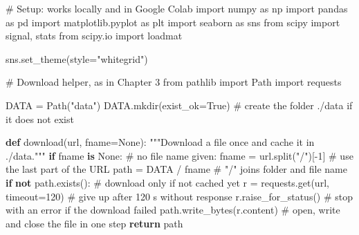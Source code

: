 \documentclass[
  letterpaper,
  DIV=11,
  numbers=noendperiod]{scrreprt}
\newenvironment{Shaded}{\begin{snugshade}}{\end{snugshade}}
\newcommand{\CommentTok}[1]{\textcolor[rgb]{0.37,0.37,0.37}{#1}}
\newcommand{\ControlFlowTok}[1]{\textcolor[rgb]{0.00,0.23,0.31}{\textbf{#1}}}
\newcommand{\DecValTok}[1]{\textcolor[rgb]{0.68,0.00,0.00}{#1}}
\newcommand{\ImportTok}[1]{\textcolor[rgb]{0.00,0.46,0.62}{#1}}
\newcommand{\KeywordTok}[1]{\textcolor[rgb]{0.00,0.23,0.31}{\textbf{#1}}}
\newcommand{\NormalTok}[1]{\textcolor[rgb]{0.00,0.23,0.31}{#1}}
\newcommand{\OperatorTok}[1]{\textcolor[rgb]{0.37,0.37,0.37}{#1}}
\newcommand{\StringTok}[1]{\textcolor[rgb]{0.13,0.47,0.30}{#1}}
\newcommand{\VariableTok}[1]{\textcolor[rgb]{0.07,0.07,0.07}{#1}}
\begin{document}
\begin{Shaded}
\begin{Highlighting}[]
\CommentTok{\# Setup: works locally and in Google Colab}
\ImportTok{import}\NormalTok{ numpy }\ImportTok{as}\NormalTok{ np}
\ImportTok{import}\NormalTok{ pandas }\ImportTok{as}\NormalTok{ pd}
\ImportTok{import}\NormalTok{ matplotlib.pyplot }\ImportTok{as}\NormalTok{ plt}
\ImportTok{import}\NormalTok{ seaborn }\ImportTok{as}\NormalTok{ sns}
\ImportTok{from}\NormalTok{ scipy }\ImportTok{import}\NormalTok{ signal, stats}
\ImportTok{from}\NormalTok{ scipy.io }\ImportTok{import}\NormalTok{ loadmat}

\NormalTok{sns.set\_theme(style}\OperatorTok{=}\StringTok{"whitegrid"}\NormalTok{)}
\end{Highlighting}
\end{Shaded}

\begin{Shaded}
\begin{Highlighting}[]
\CommentTok{\# Download helper, as in Chapter 3}
\ImportTok{from}\NormalTok{ pathlib }\ImportTok{import}\NormalTok{ Path}
\ImportTok{import}\NormalTok{ requests}

\NormalTok{DATA }\OperatorTok{=}\NormalTok{ Path(}\StringTok{"data"}\NormalTok{)}
\NormalTok{DATA.mkdir(exist\_ok}\OperatorTok{=}\VariableTok{True}\NormalTok{)                         }\CommentTok{\# create the folder ./data if it does not exist}

\KeywordTok{def}\NormalTok{ download(url, fname}\OperatorTok{=}\VariableTok{None}\NormalTok{):}
    \CommentTok{"""Download a file once and cache it in ./data."""}
    \ControlFlowTok{if}\NormalTok{ fname }\KeywordTok{is} \VariableTok{None}\NormalTok{:                             }\CommentTok{\# no file name given:}
\NormalTok{        fname }\OperatorTok{=}\NormalTok{ url.split(}\StringTok{"/"}\NormalTok{)[}\OperatorTok{{-}}\DecValTok{1}\NormalTok{]                }\CommentTok{\# use the last part of the URL}
\NormalTok{    path }\OperatorTok{=}\NormalTok{ DATA }\OperatorTok{/}\NormalTok{ fname                           }\CommentTok{\# "/" joins folder and file name}
    \ControlFlowTok{if} \KeywordTok{not}\NormalTok{ path.exists():                         }\CommentTok{\# download only if not cached yet}
\NormalTok{        r }\OperatorTok{=}\NormalTok{ requests.get(url, timeout}\OperatorTok{=}\DecValTok{120}\NormalTok{)        }\CommentTok{\# give up after 120 s without response}
\NormalTok{        r.raise\_for\_status()                      }\CommentTok{\# stop with an error if the download failed}
\NormalTok{        path.write\_bytes(r.content)               }\CommentTok{\# open, write and close the file in one step}
    \ControlFlowTok{return}\NormalTok{ path}
\end{Highlighting}
\end{Shaded}
\end{document}
